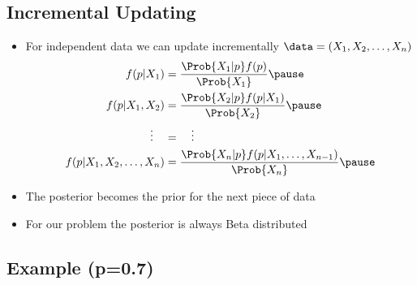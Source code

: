 \begin{slide}
\section[-2]{Incremental Updating}

\begin{PauseHighLight}
  \begin{itemize}
  \item For independent data we can update incrementally $\data = (X_1,
    X_2, \ldots, X_n)$
    \begin{align*}
      f(p|X_1) &= \frac{\Prob{X_1|p} f(p)}{\Prob{X_1}} \pause
      \\
      f(p|X_1,X_2) &= \frac{\Prob{X_2|p} f(p|X_1)}{\Prob{X_2}} \pause
      \\ 
      \vdots \quad &= \quad \vdots
      \\
      f(p|X_1,X_2,\ldots, X_n) &= \frac{\Prob{X_n|p} 
        f(p|X_1,\ldots,X_{n-1})}{\Prob{X_n}}\pause
    \end{align*} 
  \item The posterior becomes the prior for the next piece of data\pause
  \item For our problem the posterior is always Beta distributed\pause
  \end{itemize}
\end{PauseHighLight}

\end{slide}


\begin{slide}
\section[-1]{Example (p=0.7)}
\pb
\pause{}
\begin{center}
  \pause
\end{center}
\end{slide}


